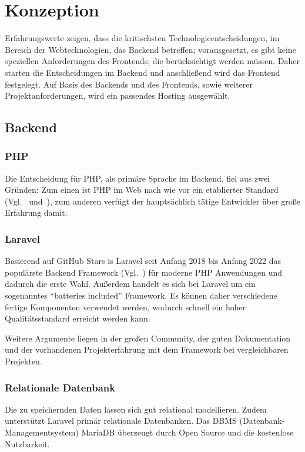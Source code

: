 \section{Konzeption}
Erfahrungswerte zeigen, dass die kritischsten Technologieentscheidungen, im Bereich der Webtechnologien, das Backend betreffen;
vorausgesetzt, es gibt keine speziellen Anforderungen des Frontends, die berücksichtigt werden müssen.
Daher starten die Entscheidungen im Backend und anschließend wird das Frontend festgelegt.
Auf Basis des Backends und des Frontends, sowie weiterer Projektanforderungen, wird ein passendes Hosting ausgewählt.

\subsection{Backend}

\subsubsection{PHP}
Die Entscheidung für PHP, als primäre Sprache im Backend, fiel aus zwei Gründen:
Zum einen ist PHP im Web nach wie vor ein etablierter Standard (Vgl.~\cite{usage-statistics-server-side-programming-languages} und~\cite{stackoverflow-survey}), zum anderen verfügt der hauptsächlich tätige Entwickler über große Erfahrung damit.

\subsubsection{Laravel}
Basierend auf GitHub Stars is Laravel seit Anfang 2018 bis Anfang 2022 das populärste Backend Framework (Vgl.~\cite{most-popular-backend-frameworks}) für moderne PHP Anwendungen und dadurch die erste Wahl.
Außerdem handelt es sich bei Laravel um ein sogenanntes \enquote{batteries included} Framework.
Es können daher verschiedene fertige Komponenten verwendet werden, wodurch schnell ein hoher Qualitätsstandard erreicht werden kann.

Weitere Argumente liegen in der großen Community, der guten Dokumentation und der vorhandenen Projekterfahrung mit dem Framework bei vergleichbaren Projekten.

\subsubsection{Relationale Datenbank}
Die zu speichernden Daten lassen sich gut relational modellieren.
Zudem unterstützt Laravel primär relationale Datenbanken.
Das DBMS (Datenbank-Managementsystem) MariaDB überzeugt durch Open Source und die kostenlose Nutzbarkeit.

